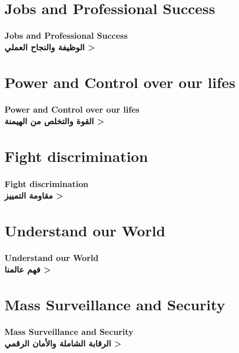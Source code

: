 \documentclass[9pt]{beamer}
\begin{document}
	\section{Jobs and Professional Success}
	\begin{frame}
		\frametitle{
			Jobs and Professional Success\\
			\<
			الوظيفة والنجاح العملي
			>
		}
		
		
	\end{frame}
	
	\section{Power and Control over our lifes}
	\begin{frame}
		\frametitle{
			Power and Control over our lifes\\
			\<
			القوة والتخلص من الهيمنة
			>
		}
	\end{frame}
	
	\section{Fight discrimination}
	\begin{frame}
		\frametitle{
			Fight discrimination\\
			\<
			مقاومة التمييز
			>
		}
	\end{frame}
	
	\section{Understand our World}
	\begin{frame}
		\frametitle{
			Understand our World\\
			\<
			فهم عالمنا
			>
		}
	\end{frame}
	
	\section{Mass Surveillance and Security}
	\begin{frame}
		\frametitle{
			Mass Surveillance and Security\\
			\<
			الرقابة الشاملة والأمان الرقمي
			>
		}
	\end{frame}
	
\end{document}

